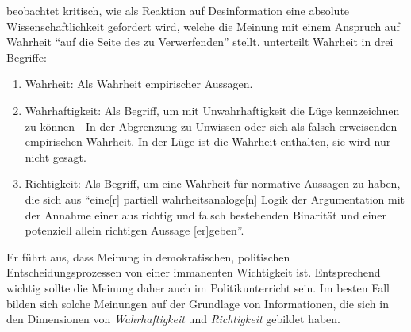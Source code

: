 \noindent \textcite{Nullmeier2019} beobachtet kritisch, wie als Reaktion auf Desinformation eine absolute Wissenschaftlichkeit gefordert wird, welche die Meinung mit einem Anspruch auf Wahrheit \enquote{auf die Seite des zu Verwerfenden} \autocite{Nullmeier2019} stellt.  \citeauthor{Nullmeier2019} unterteilt Wahrheit in drei Begriffe:
\begin{enumerate}
    \item Wahrheit: Als Wahrheit empirischer Aussagen.
    \item Wahrhaftigkeit: Als Begriff, um mit Unwahrhaftigkeit die Lüge kennzeichnen zu können - In der Abgrenzung zu Unwissen oder sich als falsch erweisenden empirischen Wahrheit. In der Lüge ist die Wahrheit enthalten, sie wird nur nicht gesagt. 
    \item Richtigkeit: Als Begriff, um eine Wahrheit für normative Aussagen zu haben, die sich aus \enquote{eine[r] partiell wahrheitsanaloge[n] Logik der Argumentation mit der Annahme einer aus richtig und falsch bestehenden Binarität und einer potenziell allein richtigen Aussage [er]geben}. 
    
    \noindent \autocite{Nullmeier2019}
\end{enumerate} 
Er führt aus, dass Meinung in demokratischen, politischen Entscheidungsprozessen von einer immanenten Wichtigkeit ist. Entsprechend wichtig sollte die Meinung daher auch im Politikunterricht sein.
Im besten Fall bilden sich solche Meinungen auf der Grundlage von Informationen, die sich in den Dimensionen von \emph{Wahrhaftigkeit} und \emph{Richtigkeit} gebildet haben. %


 


